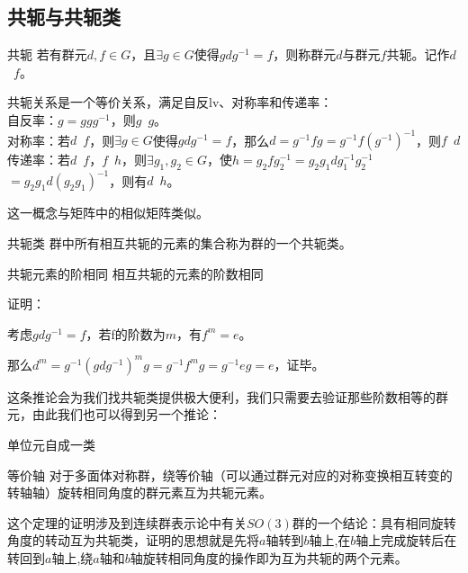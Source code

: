

\subsection{共轭与共轭类}

\begin{definition}{共轭}\label{def_gpcon_2}
若有群元$d,f\in G$，且$\exists g\in G$使得$gdg^{-1}=f$，则称群元$d$与群元$f$共轭。记作$d$~$f$。
\end{definition}

共轭关系是一个等价关系，满足自反lv、对称率和传递率：\\
自反率：$g=ggg^{-1}$，则$g$~$g$。 \\
对称率：若$d$~$f$，则$\exists g\in G$使得$gdg^{-1}=f$，那么$d=g^{-1}fg=
g^{-1}f(g^{-1})^{-1}$，则$f$~$d$ \\
传递率：若$d$~$f$，$f$~$h$，则$\exists g_1,g_2\in G$，使$h=g_2fg_2^{-1}=
g_2g_1dg_1^{-1}g_2^{-1}$ $=g_2g_1d(g_2g_1)^{-1}$，则有$d$~$h$。

这一概念与矩阵中的相似矩阵类似。

\begin{definition}{共轭类}\label{def_gpcon_1}
群中所有相互共轭的元素的集合称为群的一个共轭类。
\end{definition}

\begin{corollary}{共轭元素的阶相同}
相互共轭的元素的阶数相同
\end{corollary}
证明： 

考虑$gdg^{-1}=f$，若f的阶数为$m$，有$f^m=e$。

那么$d^m=g^{-1}(gdg^{-1})^mg=g^{-1}f^mg=g^{-1}eg=e$，证毕。

这条推论会为我们找共轭类提供极大便利，我们只需要去验证那些阶数相等的群元，由此我们也可以得到另一个推论：
\begin{corollary}{}
单位元自成一类
\end{corollary}
\begin{corollary}{等价轴}
对于多面体对称群，绕等价轴（可以通过群元对应的对称变换相互转变的转轴轴）旋转相同角度的群元素互为共轭元素。
\end{corollary}

这个定理的证明涉及到连续群表示论中有关$SO(3)$群的一个结论：具有相同旋转角度的转动互为共轭类，证明的思想就是先将$a$轴转到$b$轴上,在$b$轴上完成旋转后在转回到$a$轴上,绕$a$轴和$b$轴旋转相同角度的操作即为互为共轭的两个元素。


